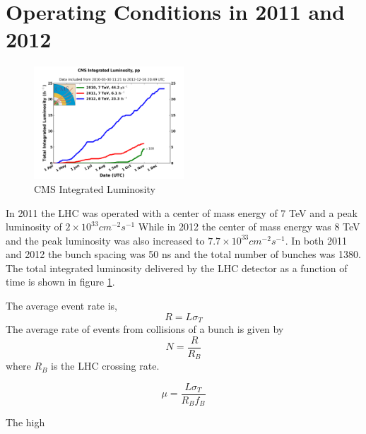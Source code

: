 \section{Operating Conditions in 2011 and 2012}
\label{sec:Conditions}
\begin{figure}[hb]
  \centering
	\includegraphics[width=0.5\textwidth]{images/int_lumi_cumulative_pp_2.png}
  	\caption[Total Integrated Luminosity]
   	{CMS Integrated Luminosity}
	\label{fig:deliveredLumi}
\end{figure}
In 2011 the LHC was operated with a center of mass energy of 7 TeV
and a peak luminosity of $2\times10^33 cm^{-2}s^{-1}$ 
While in 2012 the center of mass energy was 8 TeV and the peak luminosity
was also increased to $7.7\times10^33 cm^{-2}s^{-1}$.
In both 2011 and 2012 the bunch spacing was 50 ns and the
total number of bunches was 1380. 
The total integrated luminosity delivered by the LHC detector
as a function of time is shown in figure \ref{fig:deliveredLumi}.

The average event rate is,
\begin{equation}
R=L\sigma_{T}
\end{equation}
The average rate of events from collisions of a bunch is given by
\begin{equation}
N=\frac{R}{R_{B}}
\end{equation}
where $R_{B}$ is the LHC crossing rate. 

\begin{equation}
\mu=\frac{L\sigma_{T}}{R_{B}f_{B}}
\end{equation}

The high 